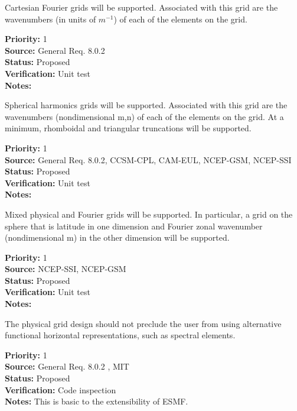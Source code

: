 Cartesian Fourier grids will be supported.  Associated with this grid are the
wavenumbers (in units of $m^{-1}$) of each of the elements on the grid.
\begin{reqlist}
{\bf Priority:} 1 \\
{\bf Source:} General Req. 8.0.2 \\
{\bf Status:} Proposed \\
{\bf Verification:} Unit test\\
{\bf Notes:}
\end{reqlist}

Spherical harmonics grids will be supported.  Associated with this grid are the
wavenumbers (nondimensional m,n) of each of the elements on the grid.  At a
minimum, rhomboidal and triangular truncations will be supported.
\begin{reqlist}
{\bf Priority:} 1 \\
{\bf Source:} General Req. 8.0.2, CCSM-CPL, CAM-EUL, NCEP-GSM, NCEP-SSI \\
{\bf Status:} Proposed \\
{\bf Verification:} Unit test\\
{\bf Notes:}
\end{reqlist}

Mixed physical and Fourier grids will be supported. In particular, a grid on the
sphere that is latitude in one dimension and Fourier zonal wavenumber
(nondimensional m) in the other dimension will be supported.
\begin{reqlist}
{\bf Priority:} 1 \\
{\bf Source:} NCEP-SSI, NCEP-GSM \\
{\bf Status:} Proposed \\
{\bf Verification:} Unit test\\
{\bf Notes:}
\end{reqlist}

The physical grid design should not preclude the user from using alternative
functional horizontal representations, such as spectral elements.
\begin{reqlist}
{\bf Priority:} 1 \\
{\bf Source:} General Req. 8.0.2 , MIT\\
{\bf Status:} Proposed \\
{\bf Verification:} Code inspection \\
{\bf Notes:} This is basic to the extensibility of ESMF.
\end{reqlist}

